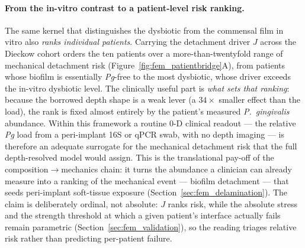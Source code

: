 \paragraph{From the in-vitro contrast to a patient-level risk ranking.} The same kernel
that distinguishes the dysbiotic from the commensal film in vitro also \emph{ranks
individual patients}. Carrying the detachment driver $J$ across the Dieckow cohort orders
the ten patients over a more-than-twentyfold range of mechanical detachment risk
(Figure~\ref{fig:fem_patientbridge}A), from patients whose biofilm is essentially
\textit{Pg}-free to the most dysbiotic, whose driver exceeds the in-vitro dysbiotic level.
The clinically useful part is \emph{what sets that ranking}: because the borrowed depth
shape is a weak lever (a $34\times$ smaller effect than the load), the rank is fixed almost
entirely by the patient's measured \textit{P.~gingivalis} abundance. Within this framework
a routine 0-D clinical readout --- the relative \textit{Pg} load from a peri-implant 16S
or qPCR swab, with no depth imaging --- is therefore an adequate surrogate for the
mechanical detachment risk that the full depth-resolved model would assign. This is the
translational pay-off of the composition$\rightarrow$mechanics chain: it turns the
abundance a clinician can already measure into a ranking of the mechanical event ---
biofilm detachment --- that seeds peri-implant soft-tissue exposure
(Section~\ref{sec:fem_delamination}). The claim is deliberately ordinal, not absolute: $J$
ranks risk, while the absolute stress and the strength threshold at which a given patient's
interface actually fails remain parametric (Section~\ref{sec:fem_validation}), so the
reading triages relative risk rather than predicting per-patient failure.
